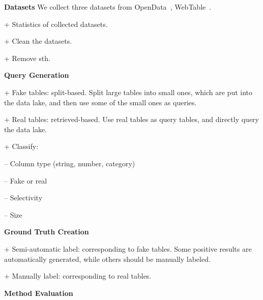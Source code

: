 \noindent\textbf{Datasets}
We collect three datasets from OpenData~\cite{OpenData}, WebTable~\cite{WebTable}. 


+ Statistics of collected datasets.

+ Clean the datasets.

+ Remove sth.



\noindent\textbf{Query Generation}

+ Fake tables: split-based. Split large tables into small ones, which are put into the data lake, and then use some of the small ones as queries.

+ Real tables: retrieved-based. Use real tables as query tables, and directly query the data lake.


+ Classify: 

\quad\quad -- Column type (string, number, category)
 
\quad\quad -- Fake or real
  
\quad\quad -- Selectivity

\quad\quad -- Size

\noindent\textbf{Ground Truth Creation}

+ Semi-automatic label: corresponding to fake tables. Some positive results are automatically generated, while others should be manually labeled.

+ Manually label: corresponding to real tables.

\noindent\textbf{Method Evaluation} 



